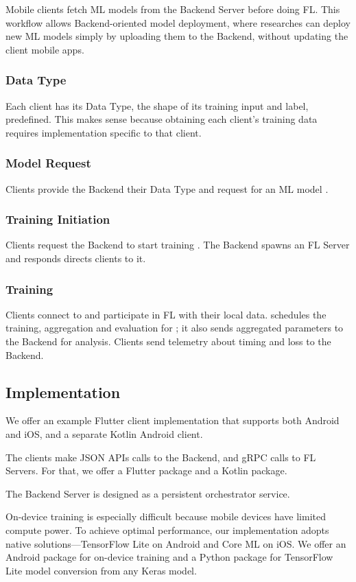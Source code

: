 \documentclass[letterpaper]{article} %
\begin{document}
Mobile clients fetch ML models from the Backend Server before doing FL.
This workflow allows Backend-oriented model deployment, where researches can
deploy new ML models simply by uploading them to the Backend,
without updating the client mobile apps.

\subsubsection{Data Type}
Each client has its Data Type, the shape of its training input and label,
predefined.
This makes sense because obtaining each client's training data requires
implementation specific to that client.

\subsubsection{Model Request}
Clients provide the Backend their Data Type and request for an ML model \model.

\subsubsection{Training Initiation}
Clients request the Backend to start training \model.
The Backend spawns an FL Server \fs{} and responds directs clients to it.

\subsubsection{Training}
Clients connect to \fs{} and participate in FL with their local data.
\fs{} schedules the training, aggregation and evaluation for \model;
it also sends aggregated parameters to the Backend for analysis.
Clients send telemetry about timing and loss to the Backend.

\subsection{Implementation}

We offer an example Flutter client implementation that supports both Android and
iOS, and a separate Kotlin Android client.

The clients make JSON APIs calls to the Backend,
and gRPC calls to FL Servers.
For that, we offer a Flutter package and a Kotlin package.

The Backend Server is designed as a persistent orchestrator service.

On-device training is especially difficult because mobile devices have limited
compute power.
To achieve optimal performance, our implementation adopts native
solutions---TensorFlow Lite on Android and Core ML on iOS.
We offer an Android package for on-device training and a Python package for
TensorFlow Lite model conversion from any Keras model.
\end{document}
